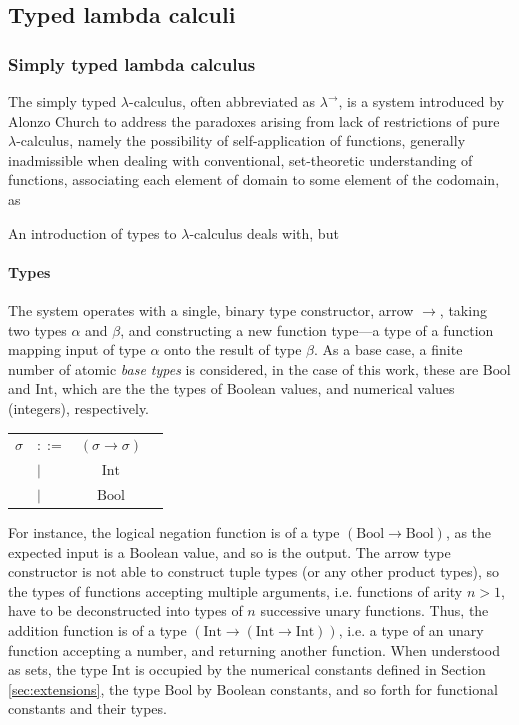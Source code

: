 \documentclass[table, a4paper, 10pt]{article}
\begin{document}
\subsection{Typed lambda calculi} \label{sec:types}

\subsubsection{Simply typed lambda calculus}
The simply typed $\lambda$-calculus, often abbreviated as $\lambda^\to$, is a system
introduced by Alonzo Church to address the paradoxes arising from lack of restrictions of pure $\lambda$-calculus,
namely the possibility of self-application of functions, generally inadmissible
when dealing with conventional, set-theoretic understanding of functions, associating
each element of domain to some element of the codomain, as

An introduction of types to $\lambda$-calculus deals with, but 

\paragraph{Types}
The system operates with a single,
binary type constructor, arrow $\to$, taking two types $\alpha$ and $\beta$, and
constructing a new function type---a type of a function mapping input of type $\alpha$ onto the result of type $\beta$.
As a base case, a finite number of atomic \textit{base types} is considered, in the case
of this work, these are {\small$\mathrm{Bool}$} and {\small$\mathrm{Int}$}, which are the
the types of Boolean values, and numerical values (integers), respectively.
\begin{center}
\begin{tabular}{llcl}
$\sigma$ &$::=$             &$(\sigma \to \sigma)$     &\\
    &\hspace{0.1cm}$|$ &$\mathrm{Int}$ &\\
    &\hspace{0.1cm}$|$ &$\mathrm{Bool}$ &
\end{tabular}
\end{center}
For instance, the logical negation function is of a type {\small$(\mathrm{Bool} \to \mathrm{Bool})$}, as the expected input
is a Boolean value, and so is the output. The arrow type constructor is not able to
construct tuple types (or any other product types), so the types of functions
accepting multiple arguments, i.e. functions of arity $n>1$, have to be deconstructed into types of $n$ successive unary functions.
Thus, the addition function is of a type {\small$(\mathrm{Int} \to (\mathrm{Int} \to \mathrm{Int}))$}, i.e. a type
of an unary function accepting a number, and returning another function.
When understood as sets, the type {\small$\mathrm{Int}$} is occupied by the numerical constants defined in 
Section \ref{sec:extensions}, the type {\small$\mathrm{Bool}$} by Boolean constants, and 
so forth for functional constants and their types.
\end{document}
